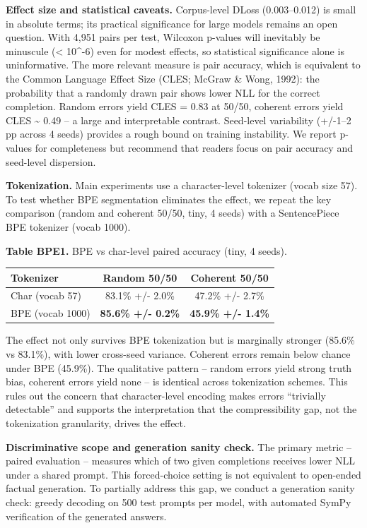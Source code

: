 \documentclass[
  11pt,
]{article}
\newcounter{none} %
\begin{document}
\textbf{Effect size and statistical caveats.} Corpus-level DLoss
(0.003--0.012) is small in absolute terms; its practical significance
for large models remains an open question. With 4,951 pairs per test,
Wilcoxon p-values will inevitably be minuscule (\textless{} 10\^{}-6)
even for modest effects, so statistical significance alone is
uninformative. The more relevant measure is pair accuracy, which is
equivalent to the Common Language Effect Size (CLES; McGraw \& Wong,
1992): the probability that a randomly drawn pair shows lower NLL for
the correct completion. Random errors yield CLES = 0.83 at 50/50,
coherent errors yield CLES \textasciitilde{} 0.49 -- a large and
interpretable contrast. Seed-level variability (+/-1--2 pp across 4
seeds) provides a rough bound on training instability. We report
p-values for completeness but recommend that readers focus on pair
accuracy and seed-level dispersion.

\textbf{Tokenization.} Main experiments use a character-level tokenizer
(vocab size 57). To test whether BPE segmentation eliminates the effect,
we repeat the key comparison (random and coherent 50/50, tiny, 4 seeds)
with a SentencePiece BPE tokenizer (vocab 1000).

\textbf{Table BPE1.} BPE vs char-level paired accuracy (tiny, 4 seeds).

{\def\LTcaptype{none} %
\begin{longtable}[]{@{}lcc@{}}
\toprule\noalign{}
Tokenizer & Random 50/50 & Coherent 50/50 \\
\midrule\noalign{}
\endhead
\bottomrule\noalign{}
\endlastfoot
Char (vocab 57) & 83.1\% +/- 2.0\% & 47.2\% +/- 2.7\% \\
BPE (vocab 1000) & \textbf{85.6\% +/- 0.2\%} & \textbf{45.9\% +/-
1.4\%} \\
\end{longtable}
}

The effect not only survives BPE tokenization but is marginally stronger
(85.6\% vs 83.1\%), with lower cross-seed variance. Coherent errors
remain below chance under BPE (45.9\%). The qualitative pattern --
random errors yield strong truth bias, coherent errors yield none -- is
identical across tokenization schemes. This rules out the concern that
character-level encoding makes errors ``trivially detectable'' and
supports the interpretation that the compressibility gap, not the
tokenization granularity, drives the effect.

\textbf{Discriminative scope and generation sanity check.} The primary
metric -- paired evaluation -- measures which of two given completions
receives lower NLL under a shared prompt. This forced-choice setting is
not equivalent to open-ended factual generation. To partially address
this gap, we conduct a generation sanity check: greedy decoding on 500
test prompts per model, with automated SymPy verification of the
generated answers.
\end{document}
